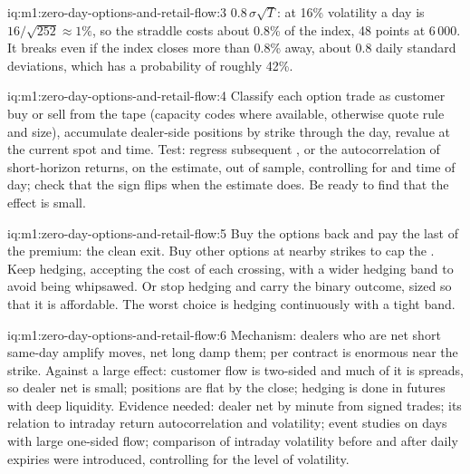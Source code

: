\begin{solution}{iq:m1:zero-day-options-and-retail-flow:3}
$0.8\,\sigma\sqrt T$: at 16\% volatility a day is $16/\sqrt{252} \approx 1\%$,
so the straddle costs about 0.8\% of the index, 48 points at 6\,000. It breaks
even if the index closes more than 0.8\% away, about 0.8 daily standard
deviations, which has a probability of roughly 42\%.
\end{solution}

\begin{solution}{iq:m1:zero-day-options-and-retail-flow:4}
Classify each option trade as customer buy or sell from the tape (capacity
codes where available, otherwise quote rule and size), accumulate
dealer-side positions by strike through the day, revalue  at the
current spot and time. Test: regress subsequent , or the
autocorrelation of short-horizon returns, on the estimate, out of sample,
controlling for  and time of day; check that the sign
flips when the estimate does. Be ready to find that the effect is small.
\end{solution}

\begin{solution}{iq:m1:zero-day-options-and-retail-flow:5}
Buy the options back and pay the last of the premium: the clean exit. Buy
other options at nearby strikes to cap the . Keep hedging, accepting the
cost of each crossing, with a wider hedging band to avoid being whipsawed.
Or stop hedging and carry the binary outcome, sized so that it is
affordable. The worst choice is hedging continuously with a tight band.
\end{solution}

\begin{solution}{iq:m1:zero-day-options-and-retail-flow:6}
Mechanism: dealers who are net short same-day  amplify moves, net long
damp them;  per contract is enormous near the strike. Against a large
effect: customer flow is two-sided and much of it is spreads, so dealer net
 is small; positions are flat by the close; hedging is done in futures
with deep liquidity. Evidence needed: dealer net  by minute from signed
trades; its relation to intraday return autocorrelation and volatility;
event studies on days with large one-sided flow; comparison of intraday
volatility before and after daily expiries were introduced, controlling for
the level of volatility.
\end{solution}
